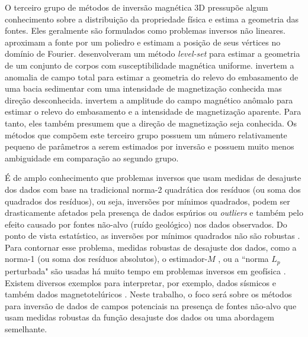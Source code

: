 O terceiro grupo de métodos de inversão magnética 3D pressupõe algum conhecimento sobre a distribuição da propriedade física e estima a geometria das fontes.
Eles geralmente são formulados como problemas inversos não lineares. \cite{wang_inversion_1990} aproximam a fonte por um poliedro e estimam a posição de seus vértices no domínio de Fourier. 
\cite{wenbin-2017} desenvolveram um método \textit{level-set} para estimar a geometria de um conjunto de corpos com susceptibilidade magnética uniforme. 
\cite{hidalgo-2019} invertem a anomalia de campo total para estimar a geometria do relevo do embasamento de uma bacia sedimentar com uma intensidade de magnetização conhecida mas direção desconhecida. 
\cite{hidalgo-2020} invertem a amplitude do campo magnético anômalo para estimar o relevo do embasamento e a intensidade de magnetização aparente.
Para tanto, eles também presumem que a direção de magnetização seja conhecida. Os métodos que compõem este terceiro grupo possuem um número relativamente pequeno de parâmetros a serem estimados por inversão e possuem muito menos ambiguidade em comparação ao segundo grupo.

É de amplo conhecimento que problemas inversos que usam medidas de desajuste dos dados com base na tradicional norma-2 quadrática dos resíduos (ou soma dos quadrados dos resíduos), ou seja, inversões por mínimos quadrados, podem ser drasticamente afetados pela presença de dados espúrios ou \textit{outliers} e também pelo efeito causado por fontes não-alvo (ruído geológico) nos dados observados.
Do ponto de vista estatístico, as inversões por mínimos quadrados não são robustas \citep{huber1964, scales_gersztenkorn1988}.
Para contornar esse problema, medidas robustas de desajuste dos dados, como a norma-1 (ou soma dos resíduos absolutos), o estimador-$ M $ \citep{huber1964}, ou a ``norma $ L_ {p} $ perturbada" \citep{ekblom1973} são usadas há muito tempo em problemas inversos em geofísica \citep{farquharson_oldenburg1998}.
Existem diversos exemplos para interpretar, por exemplo, dados sísmicos \citep[por exemplo,][]{claerbout_muir1973, scales_gersztenkorn1988, crase_etal1990, amundsen1991, guitton_symes2003, ji2012, dasilva2020} e também dados magnetotelúricos \citep[por exemplo,][]{egbert_booker1986, chave_etal1987, sutarno_vozoff1991, larsen_etal1996, matsuno_etal2014}.
Neste trabalho, o foco será sobre os métodos para inversão de dados de campos potenciais na presença de fontes não-alvo que usam medidas robustas da função desajuste dos dados ou uma abordagem semelhante.

